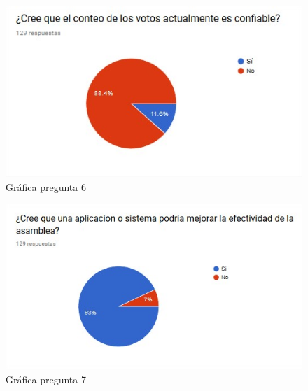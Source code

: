 \begin{figure}[th!]
	\centering
	\includegraphics[width=0.7\linewidth]{desarrollo/resultados/imgs/pregunta-6}
	\caption{Gráfica pregunta 6}
\end{figure}


\begin{figure}[th!]
	\centering
	\includegraphics[width=0.7\linewidth]{desarrollo/resultados/imgs/pregunta-7}
	\caption{Gráfica pregunta 7}
\end{figure}


\newpage